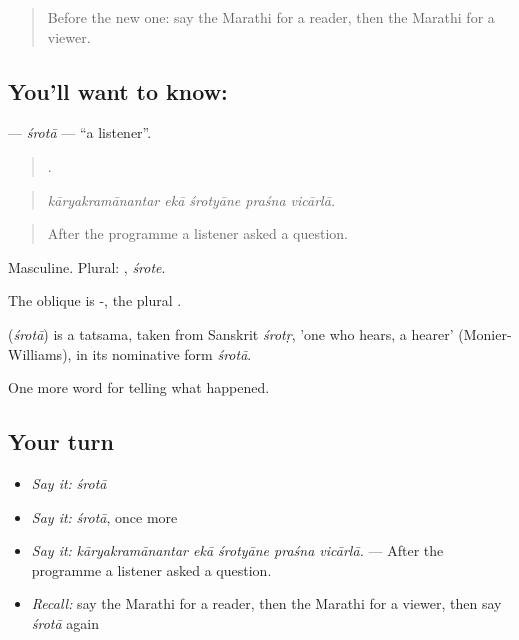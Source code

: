 \label{lesson:MR-C314-srota}



\begin{quote}
Before the new one: say the Marathi for a reader, then the Marathi for a viewer.
\end{quote}

\subsection*{You'll want to know: }
\textbf{} — \emph{śrotā} — \textquotedblleft{}a listener\textquotedblright{}.

\begin{quote}
    .
\end{quote}

\begin{quote}
\emph{kāryakramānantar ekā śrotyāne praśna vicārlā.}
\end{quote}

\begin{quote}
After the programme a listener asked a question.
\end{quote}

Masculine. Plural: , \emph{śrote}.

The oblique is -, the plural .

\begin{cousinweb}
\textbf{} (\emph{śrotā}) is a tatsama, taken from Sanskrit \emph{śrotṛ}, 'one who hears, a hearer' (Monier-Williams), in its nominative form \emph{śrotā}.
\end{cousinweb}

\begin{grammarlens}[title={What you've built}]
One more word for telling what happened.
\end{grammarlens}

\subsection*{Your turn}
\begin{itemize}
\raggedright
  \item \emph{Say it:} \emph{śrotā}
  \item \emph{Say it:} \emph{śrotā}, once more
  \item \emph{Say it:} \emph{kāryakramānantar ekā śrotyāne praśna vicārlā.} — After the programme a listener asked a question.
  \item \emph{Recall:} say the Marathi for a reader, then the Marathi for a viewer, then say \emph{śrotā} again
\end{itemize}

